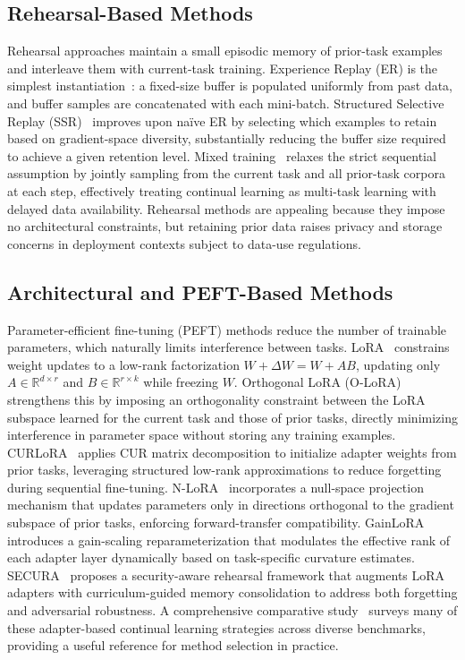 \subsection{Rehearsal-Based Methods}

Rehearsal approaches maintain a small episodic memory of prior-task examples and interleave them
with current-task training.
Experience Replay (ER) is the simplest instantiation~\cite{luo2023empirical}: a fixed-size buffer
is populated uniformly from past data, and buffer samples are concatenated with each mini-batch.
Structured Selective Replay (SSR)~\cite{huang2024ssr} improves upon na\"{i}ve ER by selecting which
examples to retain based on gradient-space diversity, substantially reducing the buffer size required
to achieve a given retention level.
Mixed training~\cite{reynolds2025mixed} relaxes the strict sequential assumption by jointly sampling
from the current task and all prior-task corpora at each step, effectively treating continual
learning as multi-task learning with delayed data availability.
Rehearsal methods are appealing because they impose no architectural constraints, but retaining prior
data raises privacy and storage concerns in deployment contexts subject to data-use regulations.

\subsection{Architectural and PEFT-Based Methods}

Parameter-efficient fine-tuning (PEFT) methods reduce the number of trainable parameters, which
naturally limits interference between tasks.
LoRA~\cite{hu2021lora} constrains weight updates to a low-rank factorization
$W + \Delta W = W + AB$, updating only $A \in \mathbb{R}^{d \times r}$ and
$B \in \mathbb{R}^{r \times k}$ while freezing $W$.
Orthogonal LoRA (O-LoRA)~\cite{wang2023olora} strengthens this by imposing an orthogonality
constraint between the LoRA subspace learned for the current task and those of prior tasks,
directly minimizing interference in parameter space without storing any training examples.
CURLoRA~\cite{fawi2024curlora} applies CUR matrix decomposition to initialize adapter weights from
prior tasks, leveraging structured low-rank approximations to reduce forgetting during sequential
fine-tuning.
N-LoRA~\cite{yang2024nlora} incorporates a null-space projection mechanism that updates parameters
only in directions orthogonal to the gradient subspace of prior tasks, enforcing forward-transfer
compatibility.
GainLoRA~\cite{liang2025gainlora} introduces a gain-scaling reparameterization that modulates the
effective rank of each adapter layer dynamically based on task-specific curvature estimates.
SECURA~\cite{zhang2025secura} proposes a security-aware rehearsal framework that augments LoRA
adapters with curriculum-guided memory consolidation to address both forgetting and adversarial
robustness.
A comprehensive comparative study~\cite{haque2025comparative} surveys many of these adapter-based
continual learning strategies across diverse benchmarks, providing a useful reference for
method selection in practice.

